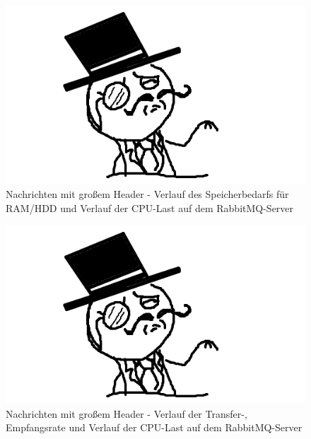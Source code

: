 \documentclass[	a4paper,
			11pt,
			titlepage,
			oneside,
			fleqn,
			listof=totoc,
			parskip,
			numbers=noenddot]{scrartcl}
\begin{document}
		\begin{figure}[!htb]
			\centering
			\includegraphics[width=\textwidth]{img/stub.png}
			\caption{Nachrichten mit großem Header - Verlauf des Speicherbedarfs für RAM/HDD und Verlauf der CPU-Last auf dem RabbitMQ-Server}
			\label{fig:header-server1}
		\end{figure}
		
		\begin{figure}[!htb]
			\centering
			\includegraphics[width=\textwidth]{img/stub.png}
			\caption{Nachrichten mit großem Header - Verlauf der Transfer-, Empfangsrate und Verlauf der CPU-Last auf dem RabbitMQ-Server}
			\label{fig:header-server2}
		\end{figure}
		
\end{document}

